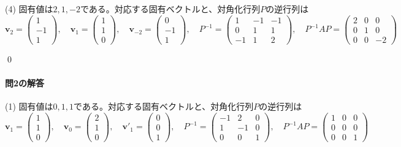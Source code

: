 \noindent (4) 固有値は$2, 1, -2$である。対応する固有ベクトルと、対角化行列$P$の逆行列は
\[
\bm{v}_2 = 
\begin{pmatrix}
1 \\
-1 \\
1
\end{pmatrix}, \quad
\bm{v}_1 = 
\begin{pmatrix}
1 \\
1 \\
0
\end{pmatrix}, \quad
\bm{v}_{-2} = 
\begin{pmatrix}
0 \\
-1 \\
1
\end{pmatrix}, \quad
P^{-1} = 
\begin{pmatrix}
1 & -1 & -1 \\
0 & 1 & 1 \\
-1 & 1 & 2
\end{pmatrix}, \quad
P^{-1} AP =
\begin{pmatrix}
2 & 0 & 0 \\
0 & 1 & 0 \\
0 & 0 & -2
\end{pmatrix}
\]

\qed

\paragraph{問2の解答}

(1) 固有値は$0, 1, 1$である。対応する固有ベクトルと、対角化行列$P$の逆行列は
\[
\bm{v}_1 = 
\begin{pmatrix}
1 \\
1 \\
0
\end{pmatrix}, \quad
\bm{v}_0 = 
\begin{pmatrix}
2 \\
1 \\
0
\end{pmatrix}, \quad
\bm{v}'_1 = 
\begin{pmatrix}
0 \\
0 \\
1
\end{pmatrix}, \quad
P^{-1} = 
\begin{pmatrix}
-1 & 2 & 0 \\
1 & -1 & 0 \\
0 & 0 & 1
\end{pmatrix}, \quad
P^{-1} AP =
\begin{pmatrix}
1 & 0 & 0 \\
0 & 0 & 0 \\
0 & 0 & 1
\end{pmatrix}
\]

